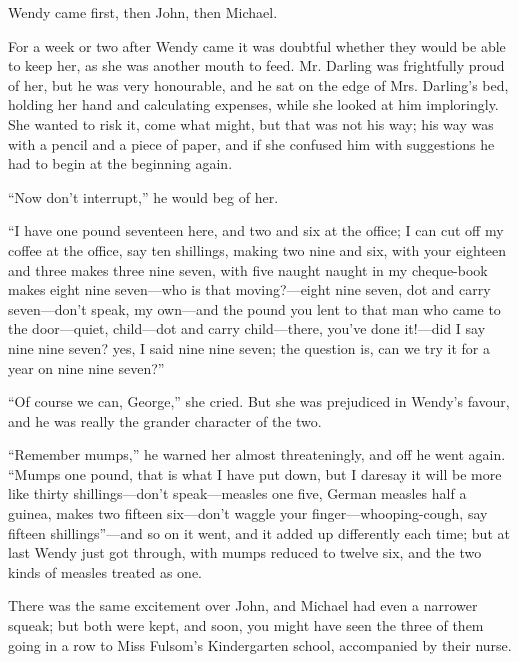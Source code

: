 Wendy came first, then John, then Michael.

For a week or two after Wendy came it was doubtful whether they would be able
to keep her, as she was another mouth to feed.
Mr. Darling was frightfully proud of her, but he was very honourable, and he
sat on the edge of Mrs. Darling's bed, holding her hand and calculating
expenses, while she looked at him imploringly.
She wanted to risk it, come what might, but that was not his way; his way was
with a pencil and a piece of paper, and if she confused him with suggestions he
had to begin at the beginning again.

``Now don't interrupt,'' he would beg of her.

“I have one pound seventeen here, and two and six at the office; I can
cut off my coffee at the office, say ten shillings, making two nine and
six, with your eighteen and three makes three nine seven, with five
naught naught in my cheque-book makes eight nine seven—who is that
moving?—eight nine seven, dot and carry seven—don’t speak, my own—and
the pound you lent to that man who came to the door—quiet, child—dot
and carry child—there, you’ve done it!—did I say nine nine seven? yes,
I said nine nine seven; the question is, can we try it for a year on
nine nine seven?”

“Of course we can, George,” she cried. But she was prejudiced in
Wendy’s favour, and he was really the grander character of the two.

“Remember mumps,” he warned her almost threateningly, and off he went
again. “Mumps one pound, that is what I have put down, but I daresay it
will be more like thirty shillings—don’t speak—measles one five, German
measles half a guinea, makes two fifteen six—don’t waggle your
finger—whooping-cough, say fifteen shillings”—and so on it went, and it
added up differently each time; but at last Wendy just got through,
with mumps reduced to twelve six, and the two kinds of measles treated
as one.

There was the same excitement over John, and Michael had even a
narrower squeak; but both were kept, and soon, you might have seen the
three of them going in a row to Miss Fulsom’s Kindergarten school,
accompanied by their nurse.

